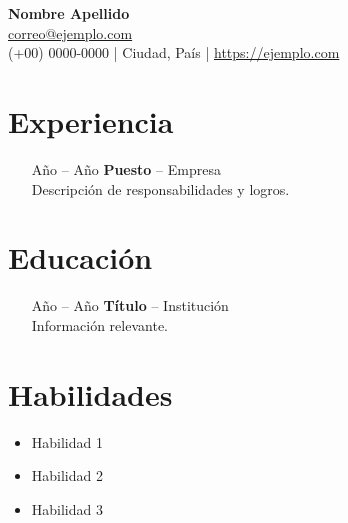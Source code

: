 \documentclass[11pt,a4paper]{article}
\begin{document}
\begin{center}
    {\LARGE \textbf{Nombre Apellido}}\\[1ex]
    \href{mailto:correo@ejemplo.com}{correo@ejemplo.com}\\
    (+00) 0000-0000 | Ciudad, País | \href{https://ejemplo.com}{https://ejemplo.com} \\
\end{center}

\section*{Experiencia}
\begin{itemize}
    \item[Año -- Año] \textbf{Puesto} -- Empresa\\
    Descripción de responsabilidades y logros.
\end{itemize}

\section*{Educación}
\begin{itemize}
    \item[Año -- Año] \textbf{Título} -- Institución\\
    Información relevante.
\end{itemize}

\section*{Habilidades}
\begin{itemize}
    \item Habilidad 1
    \item Habilidad 2
    \item Habilidad 3
\end{itemize}
\end{document}
